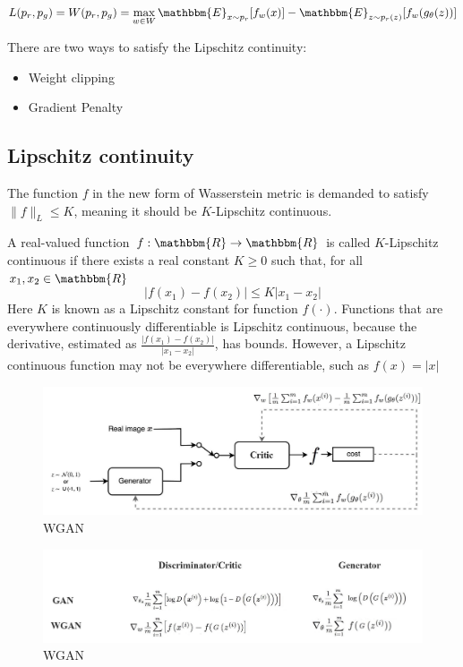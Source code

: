$$L(p_r, p_g) = W(p_r, p_g) = \max_{w \in W} \mathbbm{E}_{x \sim p_r}[f_w(x)] - \mathbbm{E}_{z \sim p_r(z)}[f_w(g_\theta(z))]$$

There are two ways to satisfy the Lipschitz continuity:
\begin{itemize}
	\item Weight clipping
	\item Gradient Penalty
\end{itemize}

\subsection{Lipschitz continuity}
The function $f$ in the new form of Wasserstein metric is demanded to satisfy $\| f \|_L \leq K$, meaning it should be $K$-Lipschitz continuous. \citep{Lil2017}

A real-valued function $f: \mathbbm{R} \rightarrow \mathbbm{R}$ is called $K$-Lipschitz continuous if there exists a real constant $K\geq 0$ such that, for all $x_1, x_2 \in \mathbbm{R}$
$$\lvert f(x_1) - f(x_2) \rvert \leq K \lvert x_1 - x_2 \rvert$$
Here $K$ is known as a Lipschitz constant for function $f(\cdot)$. Functions that are everywhere continuously differentiable is Lipschitz continuous, because the derivative, estimated as $\frac{\lvert f(x_1) - f(x_2) \rvert}{\lvert x_1 - x_2 \rvert}$, has bounds. However, a Lipschitz continuous function may not be everywhere differentiable, such as $f(x) = \lvert x \rvert$

\begin{figure}[h]
	\begin{center}
		\includegraphics[scale=0.25]{./images/generative/gan/wgan.jpeg}
	\end{center}
	\caption{WGAN}
	\label{fig:wgan}
\end{figure}

\begin{figure}[h]
	\begin{center}
		\includegraphics[scale=0.2]{./images/generative/gan/wgan_2.jpeg}
	\end{center}
	\caption{WGAN}
\end{figure}
